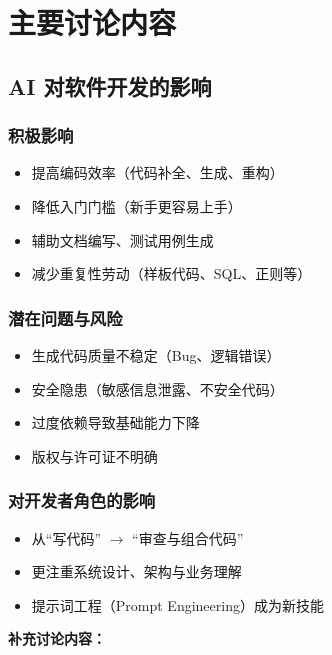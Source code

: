 \documentclass[12pt,a4paper]{article}
\begin{document}
\section{主要讨论内容}

\subsection{AI 对软件开发的影响}

\subsubsection{积极影响}
\begin{itemize}[leftmargin=2em]
    \item 提高编码效率（代码补全、生成、重构）
    \item 降低入门门槛（新手更容易上手）
    \item 辅助文档编写、测试用例生成
    \item 减少重复性劳动（样板代码、SQL、正则等）
\end{itemize}

\subsubsection{潜在问题与风险}
\begin{itemize}[leftmargin=2em]
    \item 生成代码质量不稳定（Bug、逻辑错误）
    \item 安全隐患（敏感信息泄露、不安全代码）
    \item 过度依赖导致基础能力下降
    \item 版权与许可证不明确
\end{itemize}

\subsubsection{对开发者角色的影响}
\begin{itemize}[leftmargin=2em]
    \item 从“写代码” $\rightarrow$ “审查与组合代码”
    \item 更注重系统设计、架构与业务理解
    \item 提示词工程（Prompt Engineering）成为新技能
\end{itemize}

\vspace{0.5cm}
\noindent\textbf{补充讨论内容：}\\[6pt]
\noindent\makebox[\textwidth]{}\\
\noindent\makebox[\textwidth]{}\\
\noindent\makebox[\textwidth]{}
\end{document}
